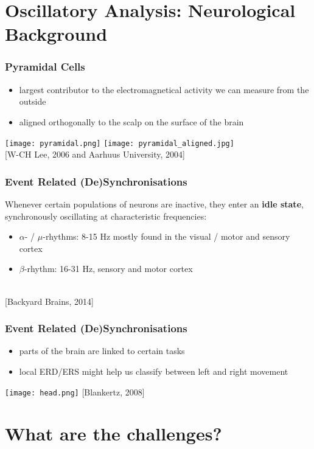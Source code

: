 \documentclass{beamer}
\begin{document}
\section{Oscillatory Analysis: Neurological Background}

\begin{frame}
\frametitle{Pyramidal Cells}
	\begin{itemize}
	\item largest contributor to the electromagnetical activity we can  measure from the outside
	\item aligned orthogonally to the scalp on the surface of the brain
	\end{itemize}
	\centering
	\texttt{[image: pyramidal.png]}
	\texttt{[image: pyramidal\_aligned.jpg]}	\\
	{\tiny [W-CH Lee, 2006 and Aarhuus University, 2004]}
\end{frame}

\begin{frame}
\frametitle{Event Related (De)Synchronisations}
	Whenever certain populations of neurons are inactive, they enter an {\bf idle state}, synchronously oscillating at characteristic frequencies:
	\begin{itemize}
		\item $\alpha$- / $\mu$-rhythms: 8-15 Hz mostly found in the visual / motor and sensory cortex
		\item $\beta$-rhythm: 16-31 Hz, sensory and motor cortex	
	\end{itemize}	
	\centering
	 \\
	{\tiny [Backyard Brains, 2014]}
\end{frame}

\begin{frame}
\frametitle{Event Related (De)Synchronisations}
	\begin{itemize}
	\item parts of the brain are linked to certain tasks
	
	\item local ERD/ERS might help us classify between left and right movement 
	\end{itemize}
	\centering
	\texttt{[image: head.png]}
	{\tiny [Blankertz, 2008]}
\end{frame}



\section{What are the challenges?}
\end{document}

